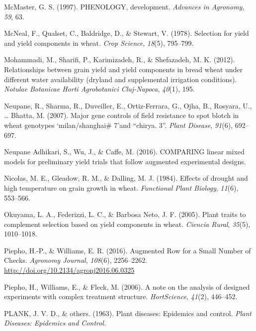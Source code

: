 \documentclass[12pt,oneside]{dukestatscithesis} %
\newlength{\cslhangindent}
\newenvironment{cslreferences}%
  {\setlength{\parindent}{0pt}%
  \everypar{\setlength{\hangindent}{\cslhangindent}}\ignorespaces}%
  {\par}
\begin{document}
\begin{cslreferences}
\leavevmode\hypertarget{ref-mcmaster1997phenology}{}%
McMaster, G. S. (1997). PHENOLOGY, development. \emph{Advances in Agronomy}, \emph{59}, 63.

\leavevmode\hypertarget{ref-mcneal1978selection}{}%
McNeal, F., Qualset, C., Baldridge, D., \& Stewart, V. (1978). Selection for yield and yield components in wheat. \emph{Crop Science}, \emph{18}(5), 795--799.

\leavevmode\hypertarget{ref-mohammadi2012relationships}{}%
Mohammadi, M., Sharifi, P., Karimizadeh, R., \& Shefazadeh, M. K. (2012). Relationships between grain yield and yield components in bread wheat under different water availability (dryland and supplemental irrigation conditions). \emph{Notulae Botanicae Horti Agrobotanici Cluj-Napoca}, \emph{40}(1), 195.

\leavevmode\hypertarget{ref-neupane2007major}{}%
Neupane, R., Sharma, R., Duveiller, E., Ortiz-Ferrara, G., Ojha, B., Rosyara, U., \ldots{} Bhatta, M. (2007). Major gene controls of field resistance to spot blotch in wheat genotypes `milan/shanghai\# 7'and ``chirya. 3''. \emph{Plant Disease}, \emph{91}(6), 692--697.

\leavevmode\hypertarget{ref-neupane2016comparing}{}%
Neupane Adhikari, S., Wu, J., \& Caffe, M. (2016). COMPARING linear mixed models for preliminary yield trials that follow augmented experimental designs.

\leavevmode\hypertarget{ref-nicolas1984effects}{}%
Nicolas, M. E., Gleadow, R. M., \& Dalling, M. J. (1984). Effects of drought and high temperature on grain growth in wheat. \emph{Functional Plant Biology}, \emph{11}(6), 553--566.

\leavevmode\hypertarget{ref-okuyama2005plant}{}%
Okuyama, L. A., Federizzi, L. C., \& Barbosa Neto, J. F. (2005). Plant traits to complement selection based on yield components in wheat. \emph{Ciencia Rural}, \emph{35}(5), 1010--1018.

\leavevmode\hypertarget{ref-piepho_augmented_2016}{}%
Piepho, H.-P., \& Williams, E. R. (2016). Augmented Row for a Small Number of Checks. \emph{Agronomy Journal}, \emph{108}(6), 2256--2262. \url{http://doi.org/10.2134/agronj2016.06.0325}

\leavevmode\hypertarget{ref-piepho2006note}{}%
Piepho, H., Williams, E., \& Fleck, M. (2006). A note on the analysis of designed experiments with complex treatment structure. \emph{HortScience}, \emph{41}(2), 446--452.

\leavevmode\hypertarget{ref-plank1963plant}{}%
PLANK, J. V. D., \& others. (1963). Plant diseases: Epidemics and control. \emph{Plant Diseases: Epidemics and Control.}


\end{cslreferences}
\end{document}
